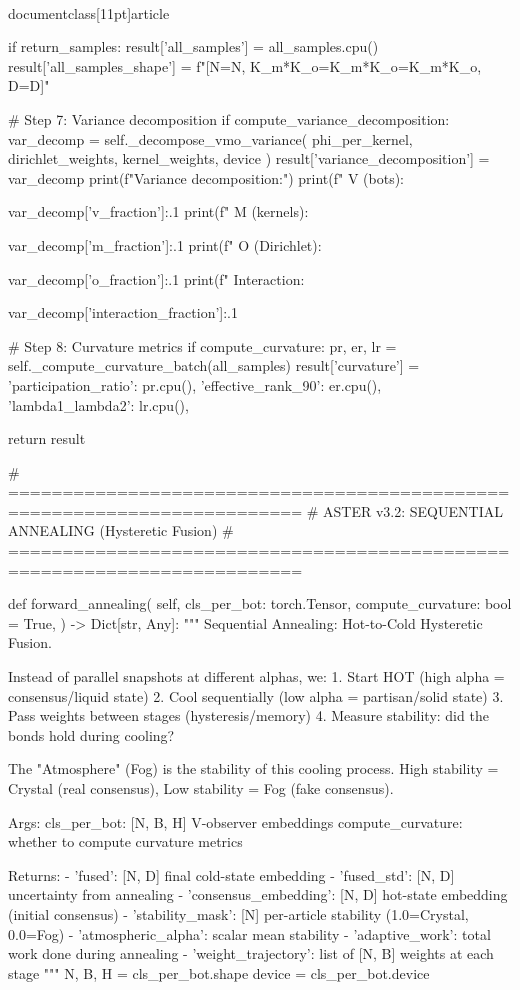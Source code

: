 \\documentclass[11pt]{article}
\begin{document}
\begin{CodeBlock}
{{{{        if return_samples:
            result['all_samples'] = all_samples.cpu()
            result['all_samples_shape'] = f"[N={N}, K_m*K_o={K_m}*{K_o}={K_m*K_o}, D={D}]"
        
        # Step 7: Variance decomposition
        if compute_variance_decomposition:
            var_decomp = self._decompose_vmo_variance(
                phi_per_kernel, dirichlet_weights, kernel_weights, device
            )
            result['variance_decomposition'] = var_decomp
            print(f"\n  Variance decomposition:")
            print(f"    V (bots):     {var_decomp['v_fraction']:.1%
            print(f"    M (kernels):  {var_decomp['m_fraction']:.1%
            print(f"    O (Dirichlet):{var_decomp['o_fraction']:.1%
            print(f"    Interaction:  {var_decomp['interaction_fraction']:.1%
        
        # Step 8: Curvature metrics
        if compute_curvature:
            pr, er, lr = self._compute_curvature_batch(all_samples)
            result['curvature'] = {
                'participation_ratio': pr.cpu(),
                'effective_rank_90': er.cpu(),
                'lambda1_lambda2': lr.cpu(),
            }
        
        return result

    # =========================================================================
    # ASTER v3.2: SEQUENTIAL ANNEALING (Hysteretic Fusion)
    # =========================================================================

    def forward_annealing(
        self,
        cls_per_bot: torch.Tensor,
        compute_curvature: bool = True,
    ) -> Dict[str, Any]:
        """
        Sequential Annealing: Hot-to-Cold Hysteretic Fusion.

        Instead of parallel snapshots at different alphas, we:
        1. Start HOT (high alpha = consensus/liquid state)
        2. Cool sequentially (low alpha = partisan/solid state)
        3. Pass weights between stages (hysteresis/memory)
        4. Measure stability: did the bonds hold during cooling?

        The "Atmosphere" (Fog) is the stability of this cooling process.
        High stability = Crystal (real consensus), Low stability = Fog (fake consensus).

        Args:
            cls_per_bot: [N, B, H] V-observer embeddings
            compute_curvature: whether to compute curvature metrics

        Returns:
            - 'fused': [N, D] final cold-state embedding
            - 'fused_std': [N, D] uncertainty from annealing
            - 'consensus_embedding': [N, D] hot-state embedding (initial consensus)
            - 'stability_mask': [N] per-article stability (1.0=Crystal, 0.0=Fog)
            - 'atmospheric_alpha': scalar mean stability
            - 'adaptive_work': total work done during annealing
            - 'weight_trajectory': list of [N, B] weights at each stage
        """
        N, B, H = cls_per_bot.shape
        device = cls_per_bot.device

}}}}}}}}
\end{CodeBlock}
\end{document}
